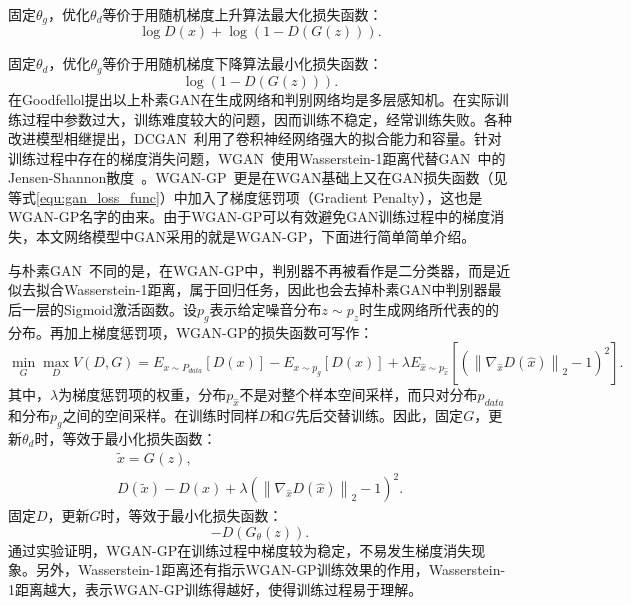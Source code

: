 \noindent 固定$\theta_{g}$，优化$\theta_{d}$等价于用随机梯度上升算法最大化损失函数：
\begin{equation}\label{equ:g_updated_loss_func}
\log D\left(x\right)+\log \left(1-D\left(G\left(z\right)\right)\right).
\end{equation}

\noindent 固定$\theta_{d}$，优化$\theta_{g}$等价于用随机梯度下降算法最小化损失函数：
\begin{equation}
\log \left(1-D\left(G\left(z\right)\right)\right).
\end{equation}
\noindent 在Goodfellol提出以上朴素GAN在生成网络和判别网络均是多层感知机。在实际训练过程中参数过大，训练难度较大的问题，因而训练不稳定，经常训练失败。各种改进模型相继提出，DCGAN~\cite{radford2015unsupervised}利用了卷积神经网络强大的拟合能力和容量。针对训练过程中存在的梯度消失问题，WGAN~\cite{gulrajani2017improved}使用Wasserstein-1距离代替GAN~\cite{goodfellow2014generative}中的Jensen-Shannon散度~\cite{arjovsky2017towards}。WGAN-GP~\cite{gulrajani2017improved}更是在WGAN基础上又在GAN损失函数（见等式\ref{equ:gan_loss_func}）中加入了梯度惩罚项（Gradient Penalty），这也是WGAN-GP名字的由来。由于WGAN-GP可以有效避免GAN训练过程中的梯度消失，本文网络模型中GAN采用的就是WGAN-GP，下面进行简单简单介绍。

与朴素GAN~\cite{goodfellow2014generative}不同的是，在WGAN-GP中，判别器不再被看作是二分类器，而是近似去拟合Wasserstein-1距离，属于回归任务，因此也会去掉朴素GAN中判别器最后一层的Sigmoid激活函数。设$p_g$表示给定噪音分布$z\sim p_z$时生成网络所代表的的分布。再加上梯度惩罚项，WGAN-GP的损失函数可写作：
\begin{equation}\label{wgan_gp_loss_func}
\min _{G} \max _{D} V(D, G)=E_{x \sim P_{d a t a}}[D(x)]-E_{x \sim p_{g}}[D(x)]+\lambda E_{\hat{x} \sim p_{\hat{x}}}\left[\left(\left\|\nabla_{\hat{x}} D(\hat{x})\right\|_{2}-1\right)^{2}\right].
\end{equation}
其中，$\lambda$为梯度惩罚项的权重，分布$p_{\hat{x}}$不是对整个样本空间采样，而只对分布$p_{data}$和分布$p_{g}$之间的空间采样。在训练时同样$D$和$G$先后交替训练。因此，固定$G$，更新$\theta_{d}$时，等效于最小化损失函数：
\begin{gather}
\tilde{{x}} = G_{}({z}), \\
D(\tilde{{x}})-D({x})+\lambda\left(\left\|\nabla_{\hat{x}} D(\hat{x})\right\|_{2}-1\right)^{2}.
\end{gather}
\noindent 固定$D$，更新$G$时，等效于最小化损失函数：
\begin{equation}
-D\left(G_{\theta}(z)\right).
\end{equation}
通过实验证明，WGAN-GP在训练过程中梯度较为稳定，不易发生梯度消失现象。另外，Wasserstein-1距离还有指示WGAN-GP训练效果的作用，Wasserstein-1距离越大，表示WGAN-GP训练得越好，使得训练过程易于理解。
